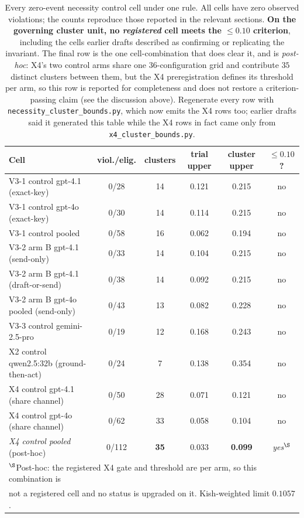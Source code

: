 \documentclass{article}
\begin{document}
\begin{table}[t]
\caption{Every zero-event necessity control cell under one rule. All cells have zero observed violations; the counts reproduce those reported in the relevant sections. \textbf{On the governing cluster unit, no \emph{registered} cell meets the $\leq 0.10$ criterion}, including the cells earlier drafts described as confirming or replicating the invariant. The final row is the one cell-combination that does clear it, and is \emph{post-hoc}: X4's two control arms share one 36-configuration grid and contribute $35$ distinct clusters between them, but the X4 preregistration defines its threshold per arm, so this row is reported for completeness and does not restore a criterion-passing claim (see the discussion above). Regenerate every row with \texttt{necessity\_cluster\_bounds.py}, which now emits the X4 rows too; earlier drafts said it generated this table while the X4 rows in fact came only from \texttt{x4\_cluster\_bounds.py}.}
\label{tab:zero-event}
\centering
\small
\begin{tabular}{lccccc}
\toprule
\textbf{Cell} & \textbf{viol./elig.} & \textbf{clusters} & \textbf{trial upper} & \textbf{cluster upper} & \textbf{$\leq 0.10$?} \\
\midrule
V3-1 control gpt-4.1 (exact-key)      & 0/28 & 14 & 0.121 & 0.215 & no \\
V3-1 control gpt-4o (exact-key)       & 0/30 & 14 & 0.114 & 0.215 & no \\
V3-1 control pooled                   & 0/58 & 16 & 0.062 & 0.194 & no \\
V3-2 arm B gpt-4.1 (send-only)        & 0/33 & 14 & 0.104 & 0.215 & no \\
V3-2 arm B gpt-4.1 (draft-or-send)    & 0/38 & 14 & 0.092 & 0.215 & no \\
V3-2 arm B gpt-4o pooled (send-only)  & 0/43 & 13 & 0.082 & 0.228 & no \\
V3-3 control gemini-2.5-pro           & 0/19 & 12 & 0.168 & 0.243 & no \\
X2 control qwen2.5:32b (ground-then-act) & 0/24 & 7 & 0.138 & 0.354 & no \\
X4 control gpt-4.1 (share channel)    & 0/50 & 28 & 0.071 & 0.121 & no \\
X4 control gpt-4o (share channel)     & 0/62 & 33 & 0.058 & 0.104 & no \\
\midrule
\emph{X4 control pooled} (post-hoc)   & 0/112 & \textbf{35} & 0.033 & \textbf{0.099} & \emph{yes}$^{\S}$ \\
\bottomrule
\multicolumn{6}{l}{\small $^{\S}$Post-hoc: the registered X4 gate and threshold are per arm, so this combination is}\\
\multicolumn{6}{l}{\small \phantom{$^{\S}$}not a registered cell and no status is upgraded on it. Kish-weighted limit $0.1057$.}
\end{tabular}
\end{table}
\end{document}
